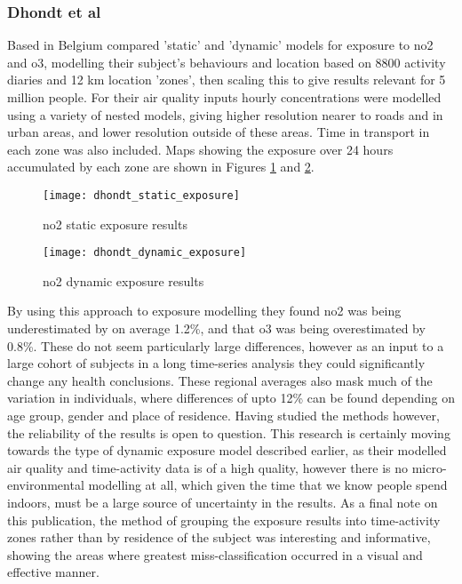 \subsubsection{Dhondt et al}
\label{sec:dynamic_models_dhondt}

Based in Belgium \cite{Dhondt2012} compared 'static' and 'dynamic' models for exposure to \gls{no2} and \gls{o3}, modelling their subject's behaviours and location based on 8800 activity diaries and 12 km location 'zones', then scaling this to give results relevant for 5 million people. For their air quality inputs hourly concentrations were modelled using a variety of nested models, giving higher resolution nearer to roads and in urban areas, and lower resolution outside of these areas. Time in transport in each zone was also included. Maps showing the exposure over 24 hours accumulated by each zone are shown in Figures \ref{fig:dhondt_static_exposure} and \ref{fig:dhondt_dynamic_exposure}.

\begin{figure}[H]
\centering
\texttt{[image: dhondt\_static\_exposure]}
\caption{\gls{no2} static exposure results}
\label{fig:dhondt_static_exposure}
\end{figure}

\begin{figure}[H]
\centering
\texttt{[image: dhondt\_dynamic\_exposure]}
\caption{\gls{no2} dynamic exposure results}
\label{fig:dhondt_dynamic_exposure}
\end{figure}

By using this approach to exposure modelling they found \gls{no2} was being underestimated by on average 1.2\%, and that \gls{o3} was being overestimated by 0.8\%. These do not seem particularly large differences, however as an input to a large cohort of subjects in a long time-series analysis they could significantly change any health conclusions. These regional averages also mask much of the variation in individuals, where differences of upto 12\% can be found depending on age group, gender and place of residence. Having studied the methods however, the reliability of the results is open to question. This research is certainly moving towards the type of dynamic exposure model described earlier, as their modelled air quality and time-activity data is of a high quality, however there is no micro-environmental modelling at all, which given the time that we know people spend indoors, must be a large source of uncertainty in the results. As a final note on this publication, the method of grouping the exposure results into time-activity zones rather than by residence of the subject was interesting and informative, showing the areas where greatest miss-classification occurred in a visual and effective manner.

